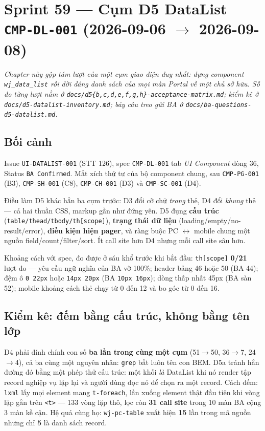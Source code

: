\chapter{Sprint 59 --- Cụm D5 DataList \texttt{CMP-DL-001} (2026-09-06 $\to$ 2026-09-08)}

\emph{Chapter này gộp tám lượt của một cụm giao diện duy nhất: dựng component
\texttt{wj\_data\_list} rồi dời dáng danh sách của mọi màn Portal về một chủ sở hữu. Số đo từng
lượt nằm ở \texttt{docs/d5\{b,c,d,e,f,g,h\}-acceptance-matrix.md}; kiểm kê ở
\texttt{docs/d5-datalist-inventory.md}; bảy câu treo gửi BA ở
\texttt{docs/ba-questions-d5-datalist.md}.}

\section{Bối cảnh}

Issue \texttt{UI-DATALIST-001} (STT 126), spec \texttt{CMP-DL-001} tab \emph{UI Component} dòng 36,
Status \texttt{BA Confirmed}. Mắt xích thứ tư của bộ component chung, sau \texttt{CMP-PG-001} (B3),
\texttt{CMP-SH-001} (C8), \texttt{CMP-CH-001} (D3) và \texttt{CMP-SC-001} (D4).

Điều làm D5 khác hẳn ba cụm trước: D3 đổi cỡ chữ \emph{trong} thẻ, D4 đổi \emph{khung} thẻ --- cả
hai thuần CSS, markup gần như đứng yên. D5 đụng \textbf{cấu trúc}
(\texttt{table/thead/tbody/th[scope]}), \textbf{trạng thái dữ liệu} (loading/empty/no-result/error),
\textbf{điều kiện hiện pager}, và ràng buộc PC $\leftrightarrow$ mobile chung một nguồn
field/count/filter/sort. Ít call site hơn D4 nhưng mỗi call site sâu hơn.

Khoảng cách với spec, đo được ở sáu khổ trước khi bắt đầu: \texttt{th[scope]} \textbf{0/21} lượt đo
--- yêu cầu ngữ nghĩa của BA vỡ 100\%; header bảng 46 hoặc 50 (BA 44); đệm ô \texttt{0 22px} hoặc
\texttt{14px 20px} (BA \texttt{10px 16px}); dòng thấp nhất 45px (BA sàn 52); mobile khoảng cách
thẻ chạy từ 0 đến 12 và bo góc từ 0 đến 16.

\section{Kiểm kê: đếm bằng cấu trúc, không bằng tên lớp}

D4 phải đính chính con số \textbf{ba lần trong cùng một cụm} (51$\to$50, 36$\to$7, 24$\to$4), cả ba
cùng một nguyên nhân: \texttt{grep} bắt luôn tên con BEM. D5a tránh hẳn đường đó bằng một phép thử
cấu trúc: một khối \emph{là} DataList khi nó render tập record nghiệp vụ lặp lại và người dùng đọc
nó để chọn ra một record. Cách đếm: \texttt{lxml} lấy mọi element mang \texttt{t-foreach}, lần
xuống element thật đầu tiên khi vòng lặp gắn trên \texttt{<t>} --- 133 vòng lặp thô, lọc còn
\textbf{31 call site} trong 10 màn BA cộng 3 màn kề cận. Hệ quả cùng họ:
\texttt{wj-pc-table} xuất hiện \textbf{15} lần trong mã nguồn nhưng chỉ \textbf{5} là danh sách
record.

